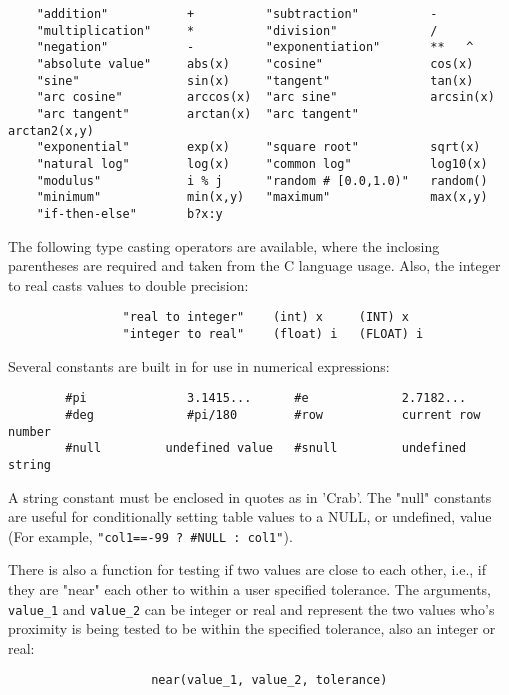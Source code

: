 \documentclass[11pt]{article}
\begin{document}
 
\begin{verbatim}
    "addition"           +          "subtraction"          -
    "multiplication"     *          "division"             /
    "negation"           -          "exponentiation"       **   ^
    "absolute value"     abs(x)     "cosine"               cos(x)
    "sine"               sin(x)     "tangent"              tan(x)
    "arc cosine"         arccos(x)  "arc sine"             arcsin(x)
    "arc tangent"        arctan(x)  "arc tangent"          arctan2(x,y)
    "exponential"        exp(x)     "square root"          sqrt(x)
    "natural log"        log(x)     "common log"           log10(x)
    "modulus"            i % j      "random # [0.0,1.0)"   random()
    "minimum"            min(x,y)   "maximum"              max(x,y)
    "if-then-else"       b?x:y
\end{verbatim}


The  following  type  casting  operators  are  available,  where the
inclosing parentheses are required and taken  from  the  C  language
usage. Also, the integer to real casts values to double precision:

\begin{verbatim}
                "real to integer"    (int) x     (INT) x
                "integer to real"    (float) i   (FLOAT) i
\end{verbatim}


Several constants are built in  for  use  in  numerical
expressions:

 
\begin{verbatim}
        #pi              3.1415...      #e             2.7182...
        #deg             #pi/180        #row           current row number
        #null         undefined value   #snull         undefined string
\end{verbatim}

A  string constant must  be enclosed  in quotes  as in  'Crab'.  The
"null" constants  are useful for conditionally  setting table values to
a NULL, or undefined, value (For example,  {\tt "col1==-99 ? \#NULL :
col1"}).

There is also a function for testing if  two  values  are  close  to
each  other,  i.e.,  if  they are "near" each other to within a user
specified tolerance. The  arguments,  {\tt value\_1}  and  {\tt value\_2}  can  be
integer  or  real  and  represent  the two values who's proximity is
being tested to be within the specified tolerance, also  an  integer
or real:

\begin{verbatim}
                    near(value_1, value_2, tolerance)
\end{verbatim}
\end{document}
